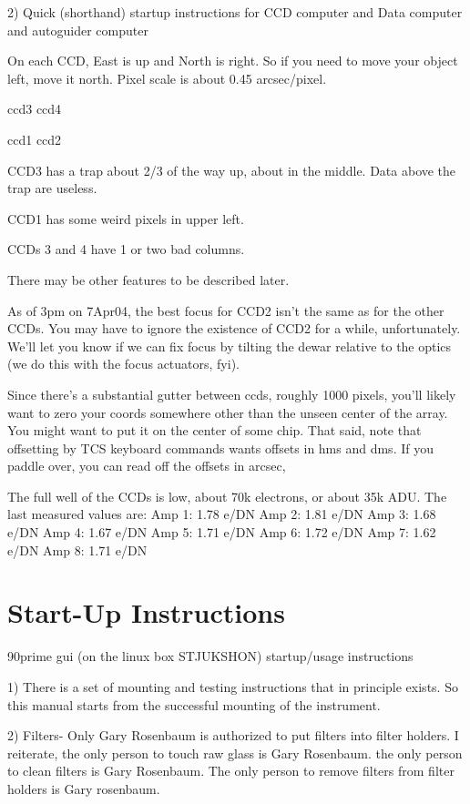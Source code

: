 \documentclass[letterpaper,12pt]{article}
\begin{document}
2) Quick (shorthand) startup instructions for CCD computer
   and Data computer and autoguider computer

On each CCD, East is up and North is right. So if you need to move your object
left, move it north. Pixel scale is about 0.45 arcsec/pixel.

ccd3     ccd4

ccd1     ccd2


CCD3 has a trap about 2/3 of the way up, about in the middle. Data above
the trap are useless.

CCD1 has some weird pixels in upper left.

CCDs 3 and 4 have 1 or two bad columns.

There may be other features to be described later.

As of 3pm on 7Apr04, the best focus for CCD2 isn't the same as for the
other CCDs. You may have to ignore the existence of CCD2 for a while,
unfortunately. We'll let you know if we can fix focus by
tilting the dewar relative to the optics (we do this with
the focus actuators, fyi).


Since there's a substantial gutter between ccds, roughly 1000 pixels,
you'll likely want to zero your coords somewhere other than the
unseen center of the array. You might want to put it on
the center of some chip. That said, note that offsetting
by TCS keyboard commands wants offsets in hms and dms. If you
paddle over, you can read off the offsets in arcsec,

The full well of the CCDs is low, about 70k electrons, or about 35k
ADU. The last measured values are:
Amp 1: 1.78 e/DN
Amp 2: 1.81 e/DN
Amp 3: 1.68 e/DN
Amp 4: 1.67 e/DN
Amp 5: 1.71 e/DN
Amp 6: 1.72 e/DN
Amp 7: 1.62 e/DN
Amp 8: 1.71 e/DN

\section{Start-Up Instructions}

90prime gui (on the linux box STJUKSHON) startup/usage instructions


1) There is a set of mounting and testing instructions that
   in principle exists. So this manual starts from the
   successful mounting of the instrument.

2) Filters- Only Gary Rosenbaum is authorized to put filters
   into filter holders. I reiterate, the only person to touch
   raw glass is Gary Rosenbaum. the only person to clean filters
   is Gary Rosenbaum. The only person to remove filters from
   filter holders is Gary rosenbaum.
\end{document}
